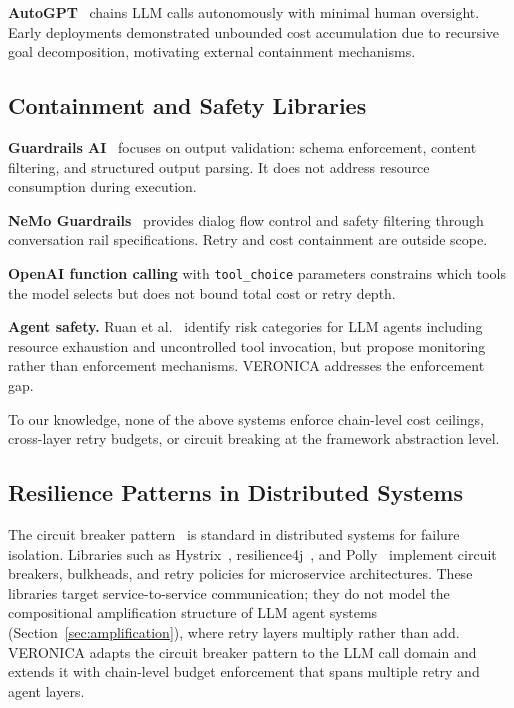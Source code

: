 \documentclass[11pt]{article}
\begin{document}
\textbf{AutoGPT}~\cite{richards2023autogpt} chains LLM calls autonomously
with minimal human oversight. Early deployments demonstrated unbounded cost
accumulation due to recursive goal decomposition, motivating external
containment mechanisms.

\subsection{Containment and Safety Libraries}

\textbf{Guardrails AI}~\cite{inan2023guardrails} focuses on output
validation: schema enforcement, content filtering, and structured output
parsing. It does not address resource consumption during execution.

\textbf{NeMo Guardrails}~\cite{rebedea2023nemo} provides dialog flow control
and safety filtering through conversation rail specifications. Retry and cost
containment are outside scope.

\textbf{OpenAI function calling} with \texttt{tool\_choice} parameters
constrains which tools the model selects but does not bound total cost or
retry depth.

\textbf{Agent safety.} Ruan et al.~\cite{ruan2023risks} identify risk
categories for LLM agents including resource exhaustion and uncontrolled tool
invocation, but propose monitoring rather than enforcement mechanisms. VERONICA
addresses the enforcement gap.

To our knowledge, none of the above systems enforce chain-level cost ceilings,
cross-layer retry budgets, or circuit breaking at the framework abstraction
level.

\subsection{Resilience Patterns in Distributed Systems}

The circuit breaker pattern~\cite{nygard2007releaseit} is standard in
distributed systems for failure isolation. Libraries such as
Hystrix~\cite{netflix2012hystrix},
resilience4j~\cite{resilience4j2017}, and
Polly~\cite{dotnet2015polly} implement circuit breakers, bulkheads, and retry
policies for microservice architectures. These libraries target
service-to-service communication; they do not model the compositional
amplification structure of LLM agent systems
(Section~\ref{sec:amplification}), where retry layers multiply rather than
add. VERONICA adapts the circuit breaker pattern to the LLM call domain and
extends it with chain-level budget enforcement that spans multiple retry and
agent layers.
\end{document}

